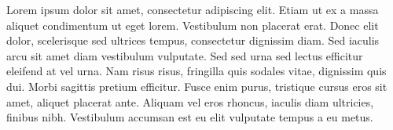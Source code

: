 Lorem ipsum dolor sit amet, consectetur adipiscing elit. Etiam ut ex a
massa aliquet condimentum ut eget lorem. Vestibulum non placerat erat.
Donec elit dolor, scelerisque sed ultrices tempus, consectetur dignissim
diam. Sed iaculis arcu sit amet diam vestibulum vulputate. Sed sed urna
sed lectus efficitur eleifend at vel urna. Nam risus risus, fringilla quis
sodales vitae, dignissim quis dui. Morbi sagittis pretium efficitur. Fusce
enim purus, tristique cursus eros sit amet, aliquet placerat ante. Aliquam
vel eros rhoncus, iaculis diam ultricies, finibus nibh. Vestibulum
accumsan est eu elit vulputate tempus a eu metus.

